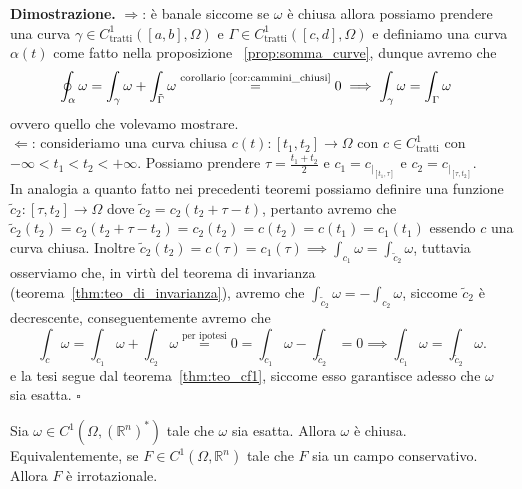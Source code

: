 \noindent \textbf{Dimostrazione. }
	$\boxed{\Rightarrow}$: è banale siccome se $\omega$ è chiusa allora possiamo prendere una curva $\gamma \in C^1_\text{tratti}([a, b], \Omega)$ e $\Gamma \in C^1_\text{tratti}([c, d], \Omega)$ e definiamo una curva $\alpha(t)$ come fatto nella proposizione
	~\ref{prop:somma_curve}, dunque avremo che
	\begin{align*}
	&\oint_\alpha \omega = \int_\gamma \omega + \int_{\tilde{\Gamma}} \omega \stackrel{\text{corollario~\ref{cor:cammini_chiusi}}}{=} 0 \implies \int_\gamma \omega = \int_\Gamma \omega &
	\end{align*}
	ovvero quello che volevamo mostrare. \\
	$\boxed{\Leftarrow}$: consideriamo una curva chiusa $c(t): [t_1, t_2] \to \Omega$ con $c \in C^1_\text{tratti}$ con $-\infty < t_1 < t_2 < +\infty$. Possiamo prendere $\tau = \frac{t_1 + t_2}{2}$ e $c_1 = c_{|_{[t_1, \tau]}}$ e $c_2 = c_{|_{[\tau, t_2]}}$. \\
	In analogia a quanto fatto nei precedenti teoremi possiamo definire una funzione $\tilde{c}_2: [\tau, t_2] \to \Omega$ dove $\tilde{c}_2 = c_2(t_2 + \tau - t)$, pertanto avremo che $\tilde{c}_2(t_2) = c_2(t_2 + \tau - t_2) = c_2(t_2) = c(t_2) = c(t_1) = c_1(t_1)$ essendo $c$ una curva chiusa.
	Inoltre $\tilde{c}_2(t_2) = c(\tau) = c_1(\tau) \implies \int_{c_1} \omega = \int_{\tilde{c}_2} \omega$, tuttavia osserviamo che, in virtù del teorema di invarianza (teorema~\ref{thm:teo_di_invarianza}), avremo che $\int_{\tilde{c}_2} \omega = - \int_{c_2} \omega$, siccome $\tilde{c}_2$ è decrescente, conseguentemente avremo che
	$$
	\int_c \omega = \int_{c_1} \omega + \int_{c_2} \omega \stackrel{\text{per ipotesi}}{=} 0 = \int_{c_1} \omega - \int_{\tilde{c}_2} = 0 \implies \int_{c_1} \omega = \int_{\tilde{c}_2} \omega.
	$$
	e la tesi segue dal teorema~\ref{thm:teo_cf1}, siccome esso garantisce adesso che $\omega$ sia esatta.
\hfill $\square$

\vspace{0.5cm}
\begin{prop}[\textcolor{blue}{le $1$-forme differenziali esatte sono chiuse}]
	Sia $\omega \in C^1(\Omega, (\mathbb{R}^n)^*)$ tale che $\omega$ sia esatta. Allora $\omega$ è chiusa. \\
	Equivalentemente, se $F \in C^1(\Omega, \mathbb{R}^n)$ tale che $F$ sia un campo conservativo. Allora $F$ è irrotazionale.
	\label{prop:esattezza_imp_chiusura}
\end{prop}

